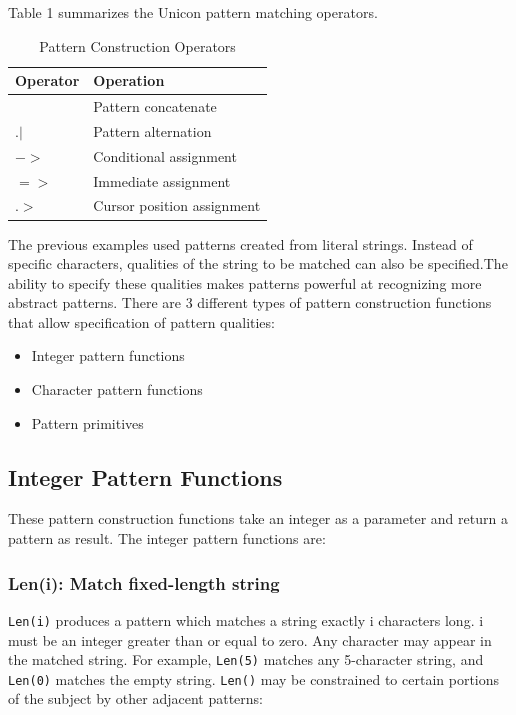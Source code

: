 \documentclass[letterpaper,12pt]{article}
\begin{document}
Table 1 summarizes the Unicon pattern matching operators.

\begin{table}[h]
\begin{center}
	{\begin{tabular}{ | l | l | } \hline 
	Operator & Operation \\ \hline
	\textbar\textbar & Pattern concatenate \\
	\(.|\) & Pattern alternation \\
	\(-\!\!>\) & Conditional assignment \\
	$=>$ & Immediate assignment \\
	$.>$ & Cursor position assignment \\
	\hline
	\end{tabular}}
 	\caption{Pattern Construction Operators}
	\label{Table 1: Pattern Construction Operators}
\end{center}
\end{table}

The previous examples used patterns created from literal
strings. Instead of specific characters, qualities of the string to be
matched can also be specified.The ability to specify these qualities
makes patterns powerful at recognizing more abstract patterns. There
are 3 different types of pattern construction functions that allow
specification of pattern qualities:

\begin{itemize}
\item Integer pattern functions
\item Character pattern functions
\item Pattern primitives
\end{itemize}

\subsection{Integer Pattern Functions}

These pattern construction functions take an integer as a parameter
and return a pattern as result. The integer pattern functions are:

\subsubsection{Len(i): Match fixed-length string}

{\tt Len(i)} produces a pattern which matches a string exactly i characters
long. i must be an integer greater than or equal to zero. Any
character may appear in the matched string. For example, {\tt Len(5)}
matches any 5-character string, and {\tt Len(0)} matches the empty
string. {\tt Len()} may be constrained to certain portions of the subject
by other adjacent patterns:
\end{document}
